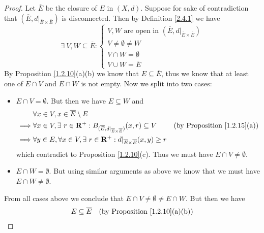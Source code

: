 \begin{proof}
    Let \(\overline{E}\) be the closure of \(E\) in \((X, d)\).
    Suppose for sake of contradiction that \((\overline{E}, d|_{\overline{E} \times \overline{E}})\) is disconnected.
    Then by Definition \ref{2.4.1} we have
    \[
        \exists\ V, W \subseteq \overline{E} : \begin{cases}
            V, W \text{ are open in } (\overline{E}, d|_{\overline{E} \times \overline{E}}) \\
            V \neq \emptyset \neq W                                                         \\
            V \cap W = \emptyset                                                            \\
            V \cup W = \overline{E}
        \end{cases}
    \]
    By Proposition \ref{1.2.10}(a)(b) we know that \(E \subseteq \overline{E}\), thus we know that at least one of \(E \cap V\) and \(E \cap W\) is not empty.
    Now we split into two cases:
    \begin{itemize}
        \item \(E \cap V = \emptyset\).
              But then we have \(E \subseteq W\) and
              \begin{align*}
                           & \forall x \in V, x \in \overline{E} \setminus E                                                                                                                      \\
                  \implies & \forall x \in V, \exists\ r \in \mathbf{R}^+ : B_{(\overline{E}, d|_{\overline{E} \times \overline{E}})}(x, r) \subseteq V & \text{(by Proposition \ref{1.2.15}(a))} \\
                  \implies & \forall y \in E, \forall x \in V, \exists\ r \in \mathbf{R}^+ : d|_{\overline{E} \times \overline{E}}(x, y) \geq r
              \end{align*}
              which contradict to Proposition \ref{1.2.10}(c).
              Thus we must have \(E \cap V \neq \emptyset\).
        \item \(E \cap W = \emptyset\).
              But using similar arguments as above we know that we must have \(E \cap W \neq \emptyset\).
    \end{itemize}
    From all cases above we conclude that \(E \cap V \neq \emptyset \neq E \cap W\).
    But then we have
    \begin{align*}
                 & E \subseteq \overline{E}                                     & \text{(by Proposition \ref{1.2.10}(a)(b))} \\

\end{align*}
\end{proof}
